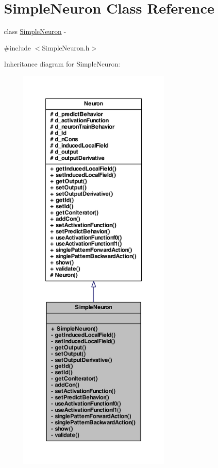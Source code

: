 \hypertarget{class_simple_neuron}{
\section{SimpleNeuron Class Reference}
\label{class_simple_neuron}
}


class \hyperlink{class_simple_neuron}{SimpleNeuron} -\/  




{\ttfamily \#include $<$SimpleNeuron.h$>$}



Inheritance diagram for SimpleNeuron:
\nopagebreak
\begin{figure}[H]
\begin{center}
\leavevmode
\includegraphics[height=600pt]{class_simple_neuron__inherit__graph}
\end{center}
\end{figure}


